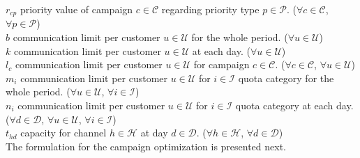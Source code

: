 \documentclass[11pt]{article}
\begin{document}
\noindent $r_{{c}{p}}$ priority value of campaign $c \in \mathcal{C}$ regarding priority type $p \in \mathcal{P}$.
($\forall c \in \mathcal{C}$, $\forall p \in \mathcal{P}$)\\

\noindent $b$ communication limit per customer $u \in \mathcal{U}$ for the whole period.
($\forall u \in \mathcal{U}$)\\

\noindent $k$ communication limit per customer $u \in \mathcal{U}$ at each day.
($\forall u \in \mathcal{U}$)\\

\noindent $l_{c}$ communication limit per customer $u \in \mathcal{U}$ for campaign $c \in \mathcal{C}$.
($\forall c \in \mathcal{C}$, $\forall u \in \mathcal{U}$)\\

\noindent $m_{i}$ communication limit per customer $u \in \mathcal{U}$ for $i \in \mathcal{I}$ quota category for the whole period.
($\forall u \in \mathcal{U}$, $\forall i \in \mathcal{I}$)\\

\noindent $n_{i}$ communication limit per customer $u \in \mathcal{U}$ for $i \in \mathcal{I}$ quota category at each day.
($\forall d \in \mathcal{D}$, $\forall u \in \mathcal{U}$, $\forall i \in \mathcal{I}$)\\

\noindent $t_{{h}{d}}$ capacity for channel $h \in \mathcal{H}$ at day $d \in \mathcal{D}$.
($\forall h \in \mathcal{H}$, $\forall d \in \mathcal{D}$)\\

\noindent The formulation for the campaign optimization is presented next.
\end{document}
